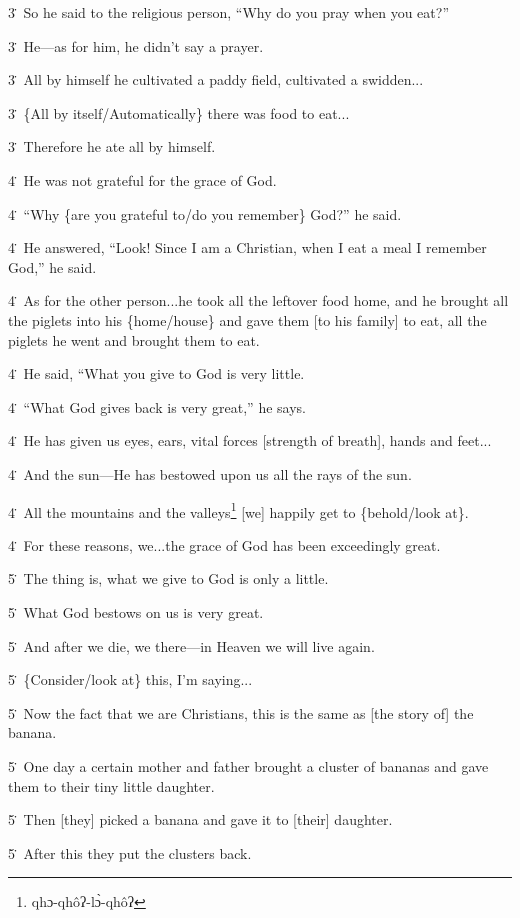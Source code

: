 3\. So he said to the religious person, ``Why do you pray when you eat?''

3\. He---as for him, he didn't say a prayer.

3\. All by himself he cultivated a paddy field, cultivated a swidden...

3\. \{All by itself/Automatically\} there was food to eat...

3\. Therefore he ate all by himself.

4\. He was not grateful for the grace of God.

4\. ``Why \{are you grateful to/do you remember\} God?'' he said.

4\. He answered, ``Look! Since I am a Christian, when I eat a meal I remember God,''
he said.

4\. As for the other person...he took all the leftover food home, and he brought
all the piglets into his \{home/house\} and gave them [to his family] to eat, all
the piglets he went and brought them to eat.

4\. He said, ``What you give to God is very little.

4\. ``What God gives back is very great,'' he says.

4\. He has given us eyes, ears, vital forces [strength of breath], hands and feet...

4\. And the sun---He has bestowed upon us all the rays of the sun.

4\. All the mountains and the valleys\footnote{qhɔ-qhôʔ-lɔ̀-qhôʔ} [we] happily get to \{behold/look at\}.

4\. For these reasons, we...the grace of God has been exceedingly great.

5\. The thing is, what we give to God is only a little.

5\. What God bestows on us is very great.

5\. And after we die, we there---in Heaven we will live again.

5\. \{Consider/look at\} this, I'm saying...

5\. Now the fact that we are Christians, this is the same as [the story of] the
banana.

5\. One day a certain mother and father brought a cluster of bananas and gave them
to their tiny little daughter.

5\. Then [they] picked a banana and gave it to [their] daughter.

5\. After this they put the clusters back.

